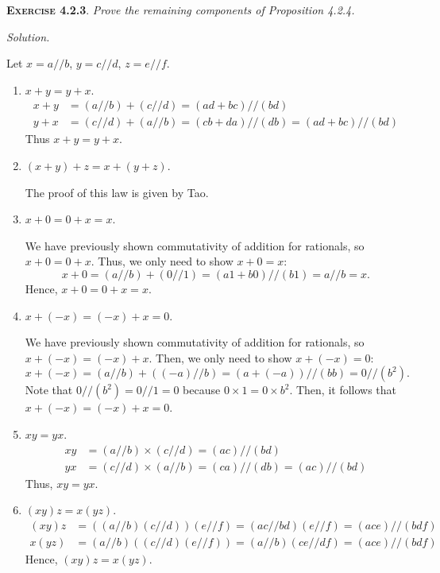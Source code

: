 \documentclass[12pt]{article}
\theoremstyle{remark}
\newenvironment{exer}[2]{
    \noindent \setlength{\parskip}{1em}%
    \textsc{\textbf{Exercise #1}}. \textit{#2} \par
    \noindent \textit{Solution.} %
}{\bigskip}
\begin{document}
\begin{exer}{4.2.3}{
     Prove the remaining components of Proposition 4.2.4.
}
    Let $x = a // b$, $y = c // d$, $z = e // f$.
    \begin{enumerate}[topsep=0mm,label=(\alph*)]
        \item $x + y = y + x$.
            \begin{align*}
                x + y
                &= (a // b) + (c // d)
                = (ad + bc) // (bd) \\
                y + x
                &= (c // d) + (a // b)
                = (cb + da) // (db)
                = (ad + bc) // (bd)
            \end{align*}
            Thus $x + y = y + x$.
            
        \item $(x + y) + z = x + (y + z)$.
            
            The proof of this law is given by Tao.
            
        \item $x + 0 = 0 + x = x$.
        
            We have previously shown commutativity of addition for rationals, so $x + 0 = 0 + x$.
            Thus, we only need to show $x + 0 = x$:
            \[
                x + 0 = (a // b) + (0 // 1) = (a1 + b0) // (b1) = a // b = x.
            \]
            Hence, $x + 0 = 0 + x = x$.
            
        \item $x + (-x) = (-x) + x = 0$.
        
            We have previously shown commutativity of addition for rationals, so $x + (-x) = (-x) + x$.
            Then, we only need to show $x + (-x) = 0$:
            \[
                x + (-x) = (a // b) + ((-a) // b) = (a + (-a)) // (bb) = 0 // (b^2).
            \]
            Note that $0 // (b^2) = 0 // 1 = 0$ because $0 \times 1 = 0 \times b^2$.
            Then, it follows that $x + (-x) = (-x) + x = 0$.
            
        \item $xy = yx$.
            \begin{align*}
                xy &= (a // b) \times (c // d) = (ac) // (bd) \\
                yx &= (c // d) \times (a // b) = (ca) // (db) = (ac) // (bd)
            \end{align*}
            Thus, $xy = yx$.

        \item $(xy)z = x(yz)$.
            \begin{align*}
                (xy)z &= ((a // b)(c // d))(e // f) = (ac // bd)(e // f) = (ace) // (bdf) \\
                x(yz) &= (a // b)((c // d)(e // f)) = (a // b)(ce // df) = (ace) // (bdf)
            \end{align*}
            Hence, $(xy)z = x(yz)$.
            

\end{enumerate}
\end{exer}
\end{document}
